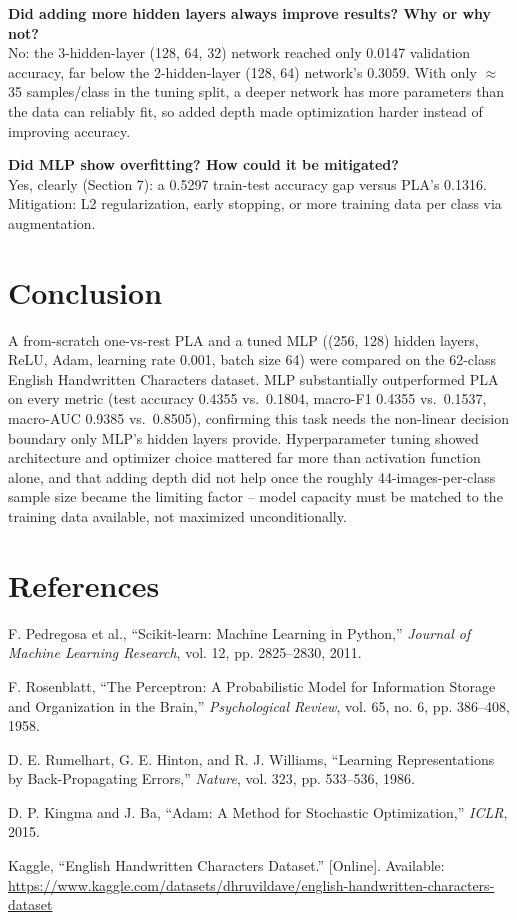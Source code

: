 \documentclass[11pt,a4paper]{article}
\begin{document}
\textbf{Did adding more hidden layers always improve results? Why or why not?}\\
No: the 3-hidden-layer (128, 64, 32) network reached only 0.0147 validation accuracy, far below the 2-hidden-layer (128, 64) network's 0.3059. With only $\approx$35 samples/class in the tuning split, a deeper network has more parameters than the data can reliably fit, so added depth made optimization harder instead of improving accuracy.

\textbf{Did MLP show overfitting? How could it be mitigated?}\\
Yes, clearly (Section 7): a 0.5297 train-test accuracy gap versus PLA's 0.1316. Mitigation: L2 regularization, early stopping, or more training data per class via augmentation.

\section{Conclusion}
A from-scratch one-vs-rest PLA and a tuned MLP ((256, 128) hidden layers, ReLU, Adam, learning rate 0.001, batch size 64) were compared on the 62-class English Handwritten Characters dataset. MLP substantially outperformed PLA on every metric (test accuracy 0.4355 vs.\ 0.1804, macro-F1 0.4355 vs.\ 0.1537, macro-AUC 0.9385 vs.\ 0.8505), confirming this task needs the non-linear decision boundary only MLP's hidden layers provide. Hyperparameter tuning showed architecture and optimizer choice mattered far more than activation function alone, and that adding depth did not help once the roughly 44-images-per-class sample size became the limiting factor -- model capacity must be matched to the training data available, not maximized unconditionally.

\section{References}
\begin{enumerate}[label={[\arabic*]}]
\item F. Pedregosa et al., ``Scikit-learn: Machine Learning in Python,'' \emph{Journal of Machine Learning Research}, vol. 12, pp. 2825--2830, 2011.
\item F. Rosenblatt, ``The Perceptron: A Probabilistic Model for Information Storage and Organization in the Brain,'' \emph{Psychological Review}, vol. 65, no. 6, pp. 386--408, 1958.
\item D. E. Rumelhart, G. E. Hinton, and R. J. Williams, ``Learning Representations by Back-Propagating Errors,'' \emph{Nature}, vol. 323, pp. 533--536, 1986.
\item D. P. Kingma and J. Ba, ``Adam: A Method for Stochastic Optimization,'' \emph{ICLR}, 2015.
\item Kaggle, ``English Handwritten Characters Dataset.'' [Online]. Available: \url{https://www.kaggle.com/datasets/dhruvildave/english-handwritten-characters-dataset}
\end{enumerate}
\end{document}
